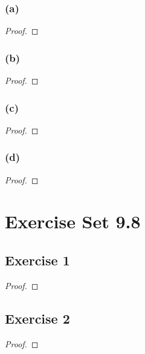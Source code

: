 \documentclass[14pt]{extarticle}
\begin{document}
\subsubsection{(a)}

\begin{proof}

\end{proof}

\subsubsection{(b)}

\begin{proof}

\end{proof}

\subsubsection{(c)}

\begin{proof}

\end{proof}

\subsubsection{(d)}

\begin{proof}

\end{proof}

\section{Exercise Set 9.8}

\subsection{Exercise 1}

\begin{proof}

\end{proof}

\subsection{Exercise 2}

\begin{proof}

\end{proof}
\end{document}
